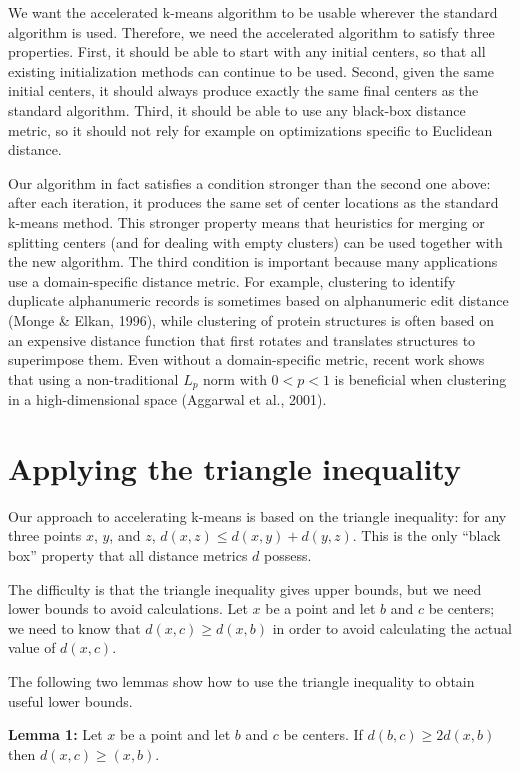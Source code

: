 We want the accelerated k-means algorithm to be usable wherever the standard algorithm is used. Therefore, we need the accelerated algorithm to satisfy three properties. First, it should be able to start with any initial centers, so that all existing initialization methods can continue to be used. Second, given the same initial centers, it should always produce exactly the same final centers as the standard algorithm. Third, it should be able to use any black-box distance metric, so it should not rely for example on optimizations specific to Euclidean distance.

Our algorithm in fact satisfies a condition stronger than the second one above: after each iteration, it produces the same set of center locations as the standard k-means method. This stronger property means that heuristics for merging or splitting centers (and for dealing with empty clusters) can be used together with the new algorithm. The third condition is important because many applications use a domain-specific distance metric. For example, clustering to identify duplicate alphanumeric records is sometimes based on alphanumeric edit distance (Monge \& Elkan, 1996), while clustering of protein structures is often based on an expensive distance function that first rotates and translates structures to superimpose them. Even without a domain-specific metric, recent work shows that using a non-traditional \( L_p \) norm with \( 0 < p < 1 \) is beneficial when clustering in a high-dimensional space (Aggarwal et al., 2001).

\chapter{Applying the triangle inequality}
Our approach to accelerating k-means is based on the triangle inequality: for any three points \( x \), \( y \), and \( z \), \( d(x, z) \le d(x, y) + d(y, z) \). This is the only ``black box'' property that all distance metrics \( d \) possess.

The difficulty is that the triangle inequality gives upper bounds, but we need lower bounds to avoid calculations. Let \( x \) be a point and let \( b \) and \( c \) be centers; we need to know that \( d(x, c) \ge d(x, b) \) in order to avoid calculating the actual value of \( d(x, c) \).

The following two lemmas show how to use the triangle inequality to obtain useful lower bounds.

\textbf{Lemma 1:} Let \( x \) be a point and let \( b \) and \( c \) be centers. If \( d(b, c) \ge 2d(x, b) \) then \( d(x, c) \ge (x, b) \).

